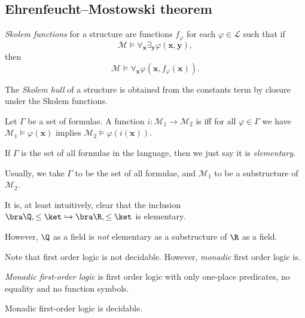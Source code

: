 \documentclass[a4paper]{article}
\begin{document}
\subsection{Ehrenfeucht--Mostowski theorem}
\begin{defi}
  \emph{Skolem functions} for a structure are functions $f_\varphi$ for each $\varphi \in \mathcal{L}$ such that if
  \[
    \mathcal{M} \vDash \forall_\mathbf{x} \exists_\mathbf{y} \varphi(\mathbf{x}, \mathbf{y}),
  \]
  then
  \[
    \mathcal{M} \vDash \forall_\mathbf{x} \varphi(\mathbf{x}, f_\varphi(\mathbf{x})).
  \]
\end{defi}

\begin{defi}
  The \emph{Skolem hull} of a structure is obtained from the constants term by closure under the Skolem functions.
\end{defi}

\begin{defi}
  Let $\Gamma$ be a set of formulae. A function $i: \mathcal{M}_1 \to \mathcal{M}_2$ is  iff for all $\varphi \in \Gamma$ we have $\mathcal{M}_1 \vDash \varphi(\mathbf{x})$ implies $\mathcal{M}_2 \vDash \varphi(i(\mathbf{x}))$.

  If $\Gamma$ is the set of all formulae in the language, then we just say it is \emph{elementary}.
\end{defi} %
Usually, we take $\Gamma$ to be the set of all formulae, and $\mathcal{M}_1$ to be a substructure of $\mathcal{M}_2$.

\begin{eg}
  It is, at least intuitively, clear that the inclusion $\bra \Q, \leq\ket \hookrightarrow \bra \R, \leq \ket$ is elementary.

  However, $\Q$ as a field is \emph{not} elementary as a substructure of $\R$ as a field.
\end{eg}

Note that first order logic is not decidable. However, \emph{monadic} first order logic is.
\begin{defi}
  \emph{Monadic first-order logic} is first order logic with only one-place predicates, no equality and no function symbols.
\end{defi}

\begin{prop}
  Monadic first-order logic is decidable.
\end{prop}
\end{document}
